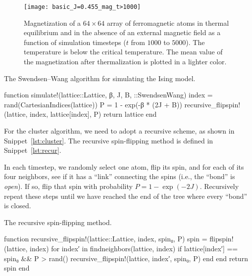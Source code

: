 \begin{figure}[hbt]
    \centering
    \texttt{[image: basic\_J=0.455\_mag\_t>1000]}
    \caption{Magnetization of a \(64 \times 64\) array of ferromagnetic atoms in thermal
        equilibrium and in the absence of an external magnetic field as a function of
        simulation timesteps (\(t\) from \(1000\) to \(5000\)). The temperature is below the
        critical temperature. The mean value of the magnetization after thermalization is
        plotted in a lighter color.}
    \label{fig:mag_J=0.455}
\end{figure}

\begin{algorithm}
    \caption{The Swendsen--Wang algorithm for simulating the Ising model.}
    \label{lst:cluster}
    \begin{juliacode}
        function simulate!(lattice::Lattice, β, J, B, ::SwendsenWang)
            index = rand(CartesianIndices(lattice))
            P = 1 - exp(-β * (2J + B))
            recursive_flipspin!(lattice, index, lattice[index], P)
            return lattice
        end
    \end{juliacode}
\end{algorithm}

For the cluster algorithm, we need to adopt a recursive scheme, as shown in
Snippet~\ref{lst:cluster}. The recursive spin-flipping method is defined in
Snippet~\ref{lst:recur}.

In each timestep, we randomly select one atom, flip its spin, and for each of its four
neighbors, see if it has a ``link'' connecting the spins (i.e., the ``bond'' is \emph{open}).
If so, flip that spin with probability \(P = 1 - \exp(-2J)\).
Recursively repeat these steps until we have reached the end of the tree where
every ``bond'' is closed.

\begin{algorithm}
    \caption{The recursive spin-flipping method.}
    \label{lst:recur}
    \begin{juliacode}
        function recursive_flipspin!(lattice::Lattice, index, spin₀, P)
            spin = flipspin!(lattice, index)
            for index′ in findneighbors(lattice, index)
                if lattice[index′] == spin₀ && P > rand()
                    recursive_flipspin!(lattice, index′, spin₀, P)
                end
            end
            return spin
        end
    \end{juliacode}
\end{algorithm}

